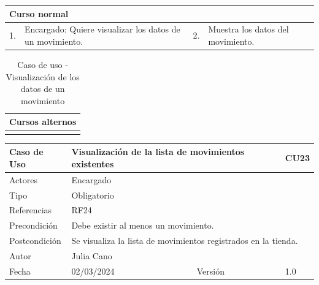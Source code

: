 \begin{table}[H]
	\centering
	\begin{tabular}{| m{} | m{} | m{} | m{} |}
		\hline
		\multicolumn{4}{|m{0.9\textwidth}|}{Curso normal}     \\ 
		\hline
		1. & Encargado: Quiere visualizar los datos de un movimiento. & 2. &  Muestra los datos del movimiento.  \\ 
		\hline
	\end{tabular}
\end{table}

\begin{table}[H]
	\centering
	\begin{tabular}{| m{} | m{} | m{} | m{} |}
		\hline
		\multicolumn{4}{|m{0.9\textwidth}|}{Cursos alternos}     \\ 
		\hline
		& \multicolumn{3}{m{0.67\textwidth}|}{} \\ 
		\hline
	\end{tabular}
	\caption{Caso de uso - Visualización de los datos de un movimiento}
\end{table}

\newpage


\begin{table}[H]
	\centering
	\begin{tabular}{| m{} | m{} | m{} | m{}|}
		\hline
		\rowcolor{grayshade} Caso de Uso & \multicolumn{2}{|m{0.43\textwidth}|}{Visualización de la lista de movimientos existentes} &  CU23\\ 
		\hline
		Actores & \multicolumn{3}{l|}{Encargado} \\ 
		\hline
		Tipo & \multicolumn{3}{l|}{Obligatorio} \\ 
		\hline
		Referencias & \multicolumn{3}{l|}{RF24} \\ 
		\hline
		Precondición & \multicolumn{3}{m{0.67\textwidth}|}{Debe existir al menos un movimiento.} \\ 
		\hline
		Postcondición & \multicolumn{3}{m{0.67\textwidth}|}{Se visualiza la lista de movimientos registrados en la tienda.} \\ 
		\hline
		Autor & \multicolumn{3}{l|}{Julia Cano} \\ 
		\hline
		Fecha & 02/03/2024 & Versión & 1.0 \\
		\hline
	\end{tabular}
\end{table}

